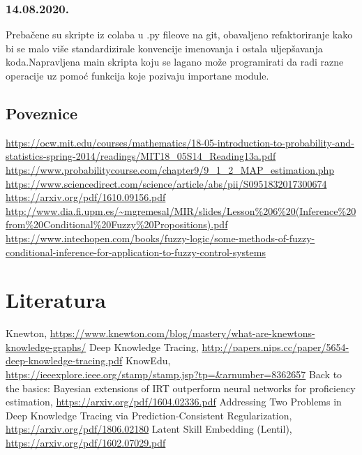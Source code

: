 \documentclass[times, utf8,projekt]{fer}
\begin{document}
		\subsection{14.08.2020.}
			Prebačene su skripte iz colaba u .py fileove na git, obavaljeno refaktoriranje kako bi se malo više standardizirale konvencije imenovanja i ostala uljepšavanja koda.Napravljena main skripta koju se lagano može programirati da radi razne operacije uz pomoć funkcija koje pozivaju importane module.
	\section{Poveznice}
	\url{https://ocw.mit.edu/courses/mathematics/18-05-introduction-to-probability-and-statistics-spring-2014/readings/MIT18_05S14_Reading13a.pdf}\newline
	\url{https://www.probabilitycourse.com/chapter9/9_1_2_MAP_estimation.php}\newline
	\url{https://www.sciencedirect.com/science/article/abs/pii/S0951832017300674}\newline
	\url{https://arxiv.org/pdf/1610.09156.pdf}\newline
	\url{http://www.dia.fi.upm.es/~mgremesal/MIR/slides/Lesson\%206\%20(Inference\%20from\%20Conditional\%20Fuzzy\%20Propositions).pdf}\newline
	\url{https://www.intechopen.com/books/fuzzy-logic/some-methods-of-fuzzy-conditional-inference-for-application-to-fuzzy-control-systems}
%
%
\chapter{Literatura}
\renewcommand{\bibsection}{}
\begin{thebibliography}{9}
	
	 Knewton, \url{https://www.knewton.com/blog/mastery/what-are-knewtons-knowledge-graphs/}
	 Deep Knowledge Tracing, \url{ http://papers.nips.cc/paper/5654-deep-knowledge-tracing.pdf}
	 KnowEdu, \url{ https://ieeexplore.ieee.org/stamp/stamp.jsp?tp=&arnumber=8362657}
	 Back to the basics: Bayesian extensions of IRT outperform
	neural networks for proficiency estimation, \url{https://arxiv.org/pdf/1604.02336.pdf}
	 Addressing Two Problems in Deep Knowledge Tracing via
	Prediction-Consistent Regularization, \url{https://arxiv.org/pdf/1806.02180}
	 Latent Skill Embedding (Lentil), \url{https://arxiv.org/pdf/1602.07029.pdf}
	
\end{thebibliography}
\end{document}
